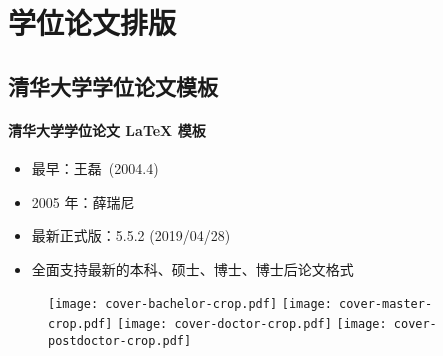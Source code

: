 \section{学位论文排版}
\subsection{\ThuThesis 清华大学学位论文模板}

\begin{frame}{\ThuThesis}
  \framesubtitle{清华大学学位论文 \LaTeX{} 模板}
  \begin{itemize}
  \item 最早：王磊~(2004.4)
  \item 2005 年：薛瑞尼
  \item 最新正式版：5.5.2 (2019/04/28)
  \item 全面支持最新的本科、硕士、博士、博士后论文格式
  \end{itemize}
  \begin{figure}[htbp]
    \centering
    \texttt{[image: cover-bachelor-crop.pdf]}\hfill
    \texttt{[image: cover-master-crop.pdf]}\hfill
    \texttt{[image: cover-doctor-crop.pdf]}\hfill
    \texttt{[image: cover-postdoctor-crop.pdf]}
  \end{figure}
\end{frame}

